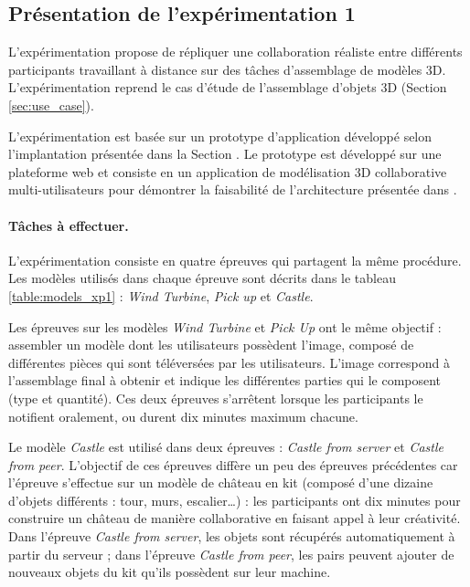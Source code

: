 
\subsection{Présentation de l'expérimentation 1}

L'expérimentation propose de répliquer une collaboration réaliste entre 
différents participants travaillant à distance sur des tâches d'assemblage de 
modèles \gls{3D}. L'expérimentation reprend le cas d'étude de l'assemblage d'objets 
\gls{3D} 
(Section \ref{sec:use_case}). 

L'expérimentation est basée sur un prototype d'application développé selon 
l'implantation présentée dans la Section .
Le prototype est développé sur une plateforme web et consiste en un application 
de modélisation \gls{3D} collaborative multi-utilisateurs pour démontrer la 
faisabilité de 
l'architecture présentée dans . 


\paragraph{Tâches à effectuer.}
L'expérimentation consiste en quatre épreuves qui partagent la même procédure.
Les modèles utilisés dans chaque épreuve sont décrits dans le tableau 
\ref{table:models_xp1} : \textit{Wind Turbine}, \textit{Pick up} et \textit{Castle}. 

Les épreuves sur les modèles \textit{Wind Turbine} et \textit{Pick Up} ont le 
même objectif : 
assembler un modèle dont les utilisateurs possèdent l'image, composé de 
différentes pièces qui sont téléversées par les utilisateurs. L'image correspond à 
l'assemblage final à obtenir et indique les différentes parties qui le 
composent (type et quantité). Ces deux épreuves s'arrêtent lorsque les participants 
le notifient oralement, ou durent dix minutes maximum chacune.

Le modèle \textit{Castle} est utilisé dans deux épreuves : 
\textit{Castle from server} et \textit{Castle from peer}. L'objectif de ces épreuves
diffère un peu des épreuves précédentes car l'épreuve s'effectue sur un  modèle 
de château en kit (composé d'une dizaine d'objets différents : tour, murs, 
escalier\dots) : les 
participants ont dix minutes pour construire un 
château de manière collaborative en faisant appel à leur créativité. 
Dans l'épreuve \textit{Castle from server}, les objets sont récupérés 
automatiquement à partir du serveur ; 
dans l'épreuve \textit{Castle from peer}, les pairs peuvent ajouter de nouveaux 
objets du kit qu'ils possèdent sur leur machine.

